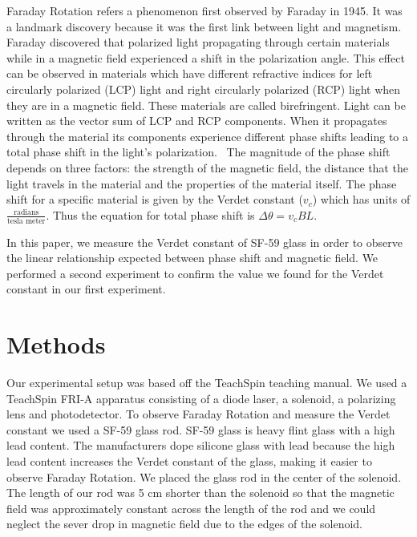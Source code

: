 \documentclass[prb,preprint]{revtex4-1}
\begin{document}
Faraday Rotation refers a phenomenon first observed by Faraday in 1945. It was a landmark discovery because it was the first link between light and magnetism.~\cite{teachspin} Faraday discovered that polarized light propagating through certain materials while in a magnetic field experienced a shift in the polarization angle. This effect can be observed in materials which have different refractive indices for left circularly polarized (LCP) light and right circularly polarized (RCP) light when they are in a magnetic field. These materials are called birefringent. Light can be written as the vector sum of LCP and RCP components. When it propagates through the material its components experience different phase shifts leading to a total phase shift in the light's polarization.~\cite{XXX} The magnitude of the phase shift depends on three factors: the strength of the magnetic field, the distance that the light travels in the material and the properties of the material itself. The phase shift for a specific material is given by the Verdet constant ($v_c$) which has units of $\frac{\text{radians}}{\text{tesla\ meter}}$. Thus the equation for total phase shift is $\Delta \theta = v_c B L$.

In this paper, we measure the Verdet constant of SF-59 glass in order to observe the linear relationship expected between phase shift and magnetic field. We performed a second experiment to confirm the value we found for the Verdet constant in our first experiment.

\section{Methods}

Our experimental setup was based off the TeachSpin teaching manual. We used a TeachSpin FRI-A apparatus consisting of a diode laser, a solenoid, a polarizing lens and photodetector. To observe Faraday Rotation and measure the Verdet constant we used a SF-59 glass rod. SF-59 glass is heavy flint glass with a high lead content. The manufacturers dope silicone glass with lead  because the high lead content increases the Verdet constant of the glass, making it easier to observe Faraday Rotation.\cite{opticalglass} We placed the glass rod in the center of the solenoid. The length of our rod was 5 cm shorter than the solenoid so that the magnetic field was approximately constant across the length of the rod and we could neglect the sever drop in magnetic field due to the edges of the solenoid.
\end{document}
